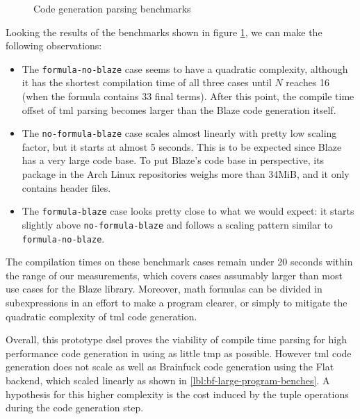 \documentclass[../main]{subfiles}
\begin{document}
\begin{figure}[h]

\caption{Code generation parsing benchmarks}
\label{fig:tml-ctbench}
\end{figure}

Looking the results of the benchmarks shown in figure \ref{fig:tml-ctbench},
we can make the following observations:

\begin{itemize}

\item
The \lstinline{formula-no-blaze} case seems to have a quadratic complexity,
although it has the shortest compilation time of all three cases until $N$
reaches 16 (\ie when the formula contains 33 final terms).
After this point, the compile time offset of \gls{tml} parsing becomes larger
than the Blaze code generation itself.

\item
The \lstinline{no-formula-blaze} case scales almost linearly with pretty low
scaling factor, but it starts at almost 5 seconds.
This is to be expected since Blaze has a very large code base.
To put Blaze's code base in perspective, its package in the Arch Linux
repositories weighs more than 34MiB, and it only contains \cpp header files.

\item
The \lstinline{formula-blaze} case looks pretty close to what we would expect:
it starts slightly above \lstinline{no-formula-blaze} and follows a scaling
pattern similar to \lstinline{formula-no-blaze}.

\end{itemize}

The compilation times on these benchmark cases remain under 20 seconds
within the range of our measurements, which covers cases assumably larger
than most use cases for the Blaze library.
Moreover, math formulas can be divided in subexpressions in an effort to
make a program clearer, or simply to mitigate the quadratic complexity
of \gls{tml} code generation.

Overall, this prototype \gls{dsel} proves the viability of compile time parsing
for high performance code generation in  using as little \gls{tmp}
as possible.
However \gls{tml} code generation does not scale as well as Brainfuck
code generation using the Flat backend, which scaled linearly as shown in
\ref{lbl:bf-large-program-benches}. A hypothesis for this higher complexity
is the cost induced by the tuple operations during the code generation step.
\end{document}
